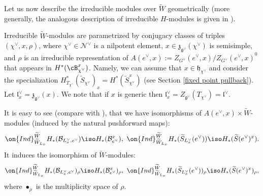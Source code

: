 \documentclass[12pt]{amsart}
\begin{document}
Let us now describe the irreducible modules over $\widetilde{W}$ geometrically (more generally, the analogous description of irreducible $H$-modules is given in \cite[Theorem 1.15]{lusztig_cuspidalIII}). 




Irreducible $\widetilde{W}$-modules are parametrized by conjugacy classes of triples $(\chi^\vee,x,\rho)$, where $\chi^\vee \in \mathcal{N}^\vee$ is a nilpotent element, $x \in \mathfrak{z}_{\mathfrak{g}^{\vee}}(\chi^\vee)$ is semisimple, and $\rho$ is an irreducible representation of $A(e^\vee,x):=Z_{G^\vee}(e^\vee,x)/Z_{G^\vee}(e^\vee,x)^0$ that appears in $H^*(\cB_{\chi^\vee}^{x})$. Namely, we can assume that $x \in \mathfrak{h}_{\chi^\vee}$ and consider the specialization $H^*_{T_{\chi^\vee}}(\widetilde{S}_{\chi^\vee})_{x}=H^*(\widetilde{S}_{\chi^\vee}^{x})$ (see Section \ref{fixed point pullback}). Let $\mathfrak{l}_x^\vee=\mathfrak{z}_{\mathfrak{g}^\vee}(x)$. We note that if $x$ is generic then $\mathfrak{l}_x^\vee=Z_{\mathfrak{g}^\vee}(T_{\chi^\vee})=\mathfrak{l}^\vee$.

It is easy to see (compare with \cite[Proposition 6.2]{KATO1983193}),  that we have isomorphisms of $A(e^\vee,x) \times \widetilde{W}$-modules (induced by the natural pushforward maps):
\begin{equation*}
\on{Ind}_{\widetilde{W}_{L_x}}^{\widetilde{W}}H_*(\mathcal{B}_{L_{x}^\vee,e^\vee}) \iso H_*(\mathcal{B}_{e^\vee}^x),~ \on{Ind}_{\widetilde{W}_{L_x}}^{\widetilde{W}}H_*(\widetilde{S}_{L^\vee_x}(e^{\vee})) \iso H_*(\widetilde{S}({e^\vee})^{x}).
\end{equation*}
It induces the isomorphism of $\widetilde{W}$-modules:
\begin{equation}\label{iso_induction_Kato}
\on{Ind}_{\widetilde{W}_{L_x}}^{\widetilde{W}}H_*(\mathcal{B}_{L_{x}^\vee,e^\vee})_\rho \iso H_*(\mathcal{B}_{e^\vee}^x)_{\rho},~ \on{Ind}_{\widetilde{W}_{L_x}}^{\widetilde{W}}H_*(\widetilde{S}_{L^\vee_x}(e^{\vee}))_{\rho} \iso H_*(\widetilde{S}(e^\vee)^{x})_{\rho},
\end{equation}
where $\bullet_{\rho}$ is the multiplicity space of $\rho$.
\end{document}
